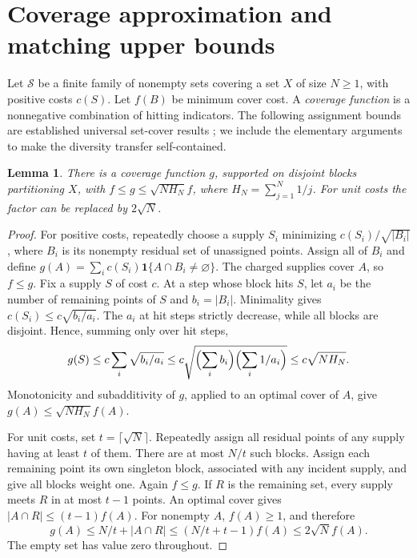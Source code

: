 \documentclass[11pt]{article}
\newtheorem{lemma}[theorem]{Lemma}
\newcommand{\ind}{\mathbf 1}
\begin{document}
\section{Coverage approximation and matching upper bounds}
Let $\mathcal S$ be a finite family of nonempty sets covering a set $X$ of
size $N\ge1$, with positive costs $c(S)$. Let $f(B)$ be minimum cover cost.
A \emph{coverage function} is a nonnegative combination of hitting indicators.
The following assignment bounds are established universal set-cover results
\cite{JIA,JRP}; we include the elementary arguments to make the diversity
transfer self-contained.

\begin{lemma}\label{lem:assignment}
There is a coverage function $g$, supported on disjoint blocks partitioning $X$,
with $f\le g\le\sqrt{NH_N}f$, where $H_N=\sum_{j=1}^N1/j$.
For unit costs the factor can be replaced by $2\sqrt N$.
\end{lemma}
\begin{proof}
For positive costs, repeatedly choose a supply $S_i$ minimizing
$c(S_i)/\sqrt{|B_i|}$, where $B_i$ is its nonempty residual set of unassigned
points. Assign all of $B_i$ and define
$g(A)=\sum_i c(S_i)\ind\{A\cap B_i\ne\varnothing\}$.
The charged supplies cover $A$, so $f\le g$.
Fix a supply $S$ of cost $c$. At a step whose block hits $S$, let $a_i$ be
the number of remaining points of $S$ and $b_i=|B_i|$. Minimality gives
$c(S_i)\le c\sqrt{b_i/a_i}$. The $a_i$ at hit steps strictly decrease,
while all blocks are disjoint. Hence, summing only over hit steps,
\[
 g(S)\le c\sum_i\sqrt{b_i/a_i}
 \le c\sqrt{\Bigl(\sum_i b_i\Bigr)\Bigl(\sum_i1/a_i\Bigr)}
 \le c\sqrt{NH_N}.
\]
Monotonicity and subadditivity of $g$, applied to an optimal cover of $A$,
give $g(A)\le\sqrt{NH_N}f(A)$.

For unit costs, set $t=\lceil\sqrt N\rceil$. Repeatedly assign all residual
points of any supply having at least $t$ of them. There are at most $N/t$
such blocks. Assign each remaining point its own singleton block, associated
with any incident supply, and give all blocks weight one. Again $f\le g$.
If $R$ is the remaining set, every supply meets $R$ in at most $t-1$ points.
An optimal cover gives $|A\cap R|\le(t-1)f(A)$. For nonempty $A$, $f(A)\ge1$,
and therefore
\[
 g(A)\le N/t+|A\cap R|\le(N/t+t-1)f(A)\le2\sqrt N f(A).
\]
The empty set has value zero throughout.
\end{proof}
\end{document}
